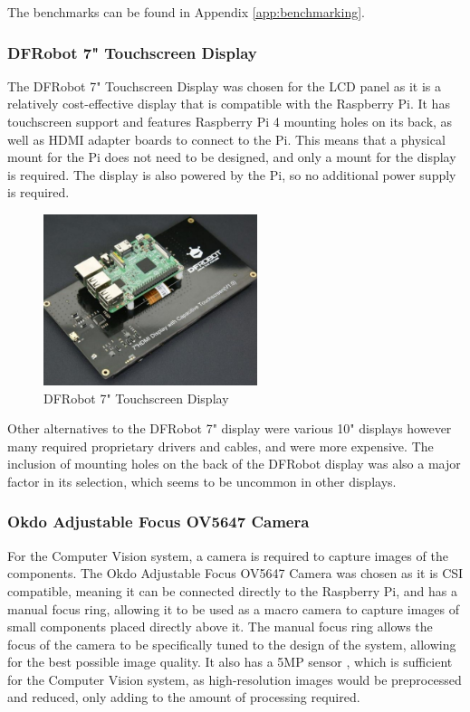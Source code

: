 The benchmarks can be found in Appendix \autoref{app:benchmarking}.

\subsubsection{DFRobot 7" Touchscreen Display}
The DFRobot 7" Touchscreen Display was chosen for the LCD panel as it is a relatively cost-effective display that is compatible with the Raspberry Pi. It has touchscreen support and features Raspberry Pi 4 mounting holes on its back, as well as HDMI adapter boards to connect to the Pi. This means that a physical mount for the Pi does not need to be designed, and only a mount for the display is required. The display is also powered by the Pi, so no additional power supply is required. 

\begin{figure}[H]
    \begin{minipage}[t]{\textwidth}
      \centering
      \includegraphics[width=\textwidth,height=5cm, keepaspectratio]{imgs/parts/dfrobot_screen.jpg}
      \caption{DFRobot 7" Touchscreen Display \cite{7inchdisplay}}
    \end{minipage}
\end{figure}

Other alternatives to the DFRobot 7" display were various 10" displays however many required proprietary drivers and cables, and were more expensive. The inclusion of mounting holes on the back of the DFRobot display was also a major factor in its selection, which seems to be uncommon in other displays.

\subsubsection{Okdo Adjustable Focus OV5647 Camera}
For the Computer Vision system, a camera is required to capture images of the components. The Okdo Adjustable Focus OV5647 Camera was chosen as it is CSI compatible, meaning it can be connected directly to the Raspberry Pi, and has a manual focus ring, allowing it to be used as a macro camera to capture images of small components placed directly above it. The manual focus ring allows the focus of the camera to be specifically tuned to the design of the system, allowing for the best possible image quality. It also has a 5MP sensor \cite{okdospec}, which is sufficient for the Computer Vision system, as high-resolution images would be preprocessed and reduced, only adding to the amount of processing required.

